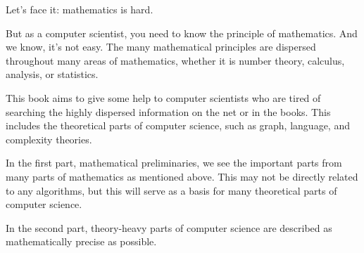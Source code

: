 \documentclass{report}
\begin{document}
	Let's face it: mathematics is hard.
	
	But as a computer scientist, you need to know the principle of mathematics. And we know, it's not easy. The many mathematical principles are dispersed throughout many areas of mathematics, whether it is number theory, calculus, analysis, or statistics.
	
	This book aims to give some help to computer scientists who are tired of searching the highly dispersed information on the net or in the books. This includes the theoretical parts of computer science, such as graph, language, and complexity theories.
	
	In the first part, mathematical preliminaries, we see the important parts from many parts of mathematics as mentioned above. This may not be directly related to any algorithms, but this will serve as a basis for many theoretical parts of computer science.
	
	In the second part, theory-heavy parts of computer science are described as mathematically precise as possible. 
\end{document}
